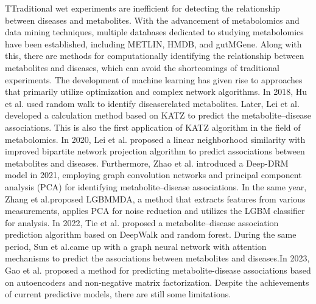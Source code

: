 \documentclass[lettersize,journal]{IEEEtran}
\begin{document}
TTraditional wet experiments are inefficient for detecting the relationship between diseases and metabolites. With the advancement of metabolomics and data mining techniques, multiple databases dedicated to studying metabolomics have been established, including METLIN\cite{montenegro2020metlin}, HMDB\cite{wishart2022hmdb}, and gutMGene\cite{cheng2022gutmgene}. Along with this, there are methods for computationally identifying the relationship between metabolites and diseases, which can avoid the shortcomings of traditional experiments. The development of machine learning has given rise to approaches that primarily utilize optimization and complex network algorithms.
In 2018, Hu et al. used random walk to identify diseaserelated metabolites\cite{hu2018identifying}. Later, Lei et al. developed a calculation method based on KATZ to predict the metabolite–disease associations\cite{lei2019predicting}. This is also the first application of KATZ algorithm in the field of metabolomics. In 2020, Lei et al. proposed a linear neighborhood similarity with improved bipartite network projection algorithm to predict associations between metabolites and diseases\cite{lei2020predicting}. Furthermore, Zhao et al. introduced a Deep-DRM model in 2021\cite{zhao2021deep}, employing graph convolution networks and principal component analysis (PCA) for identifying metabolite–disease associations. In the same year, Zhang et al.proposed LGBMMDA\cite{zhang2021predicting}, a method that extracts features from various measurements, applies PCA for noise reduction and utilizes the LGBM classifier for analysis. In 2022, Tie et al. proposed a metabolite–disease association prediction algorithm based on DeepWalk and random forest\cite{tie2021metabolite}. During the same period, Sun et al.came up with a graph neural network with attention mechanisms to predict the associations between metabolites and diseases\cite{sun2022deep}.In 2023, Gao et al. proposed a method for predicting metabolite-disease associations based on autoencoders and non-negative matrix factorization\cite{gao2023predicting}. Despite the achievements of current predictive models, there are still some limitations.
\end{document}
